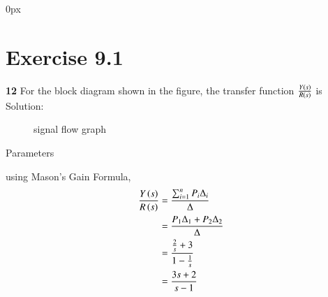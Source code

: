 \documentclass[journal,12pt,twocolumn]{IEEEtran}
\theoremstyle{remark}
\begin{document}
\parindent 0px


\vspace{3cm}

\title{}
\author{EE23BTECH11217 - Prajwal M$^{*}$
}
\maketitle
\newpage
\bigskip



\section*{Exercise 9.1}

\noindent \textbf{12} \hspace{2pt}For the block diagram shown in the figure, the transfer function $\frac{Y\left(s\right)}{R\left(s\right)}$ is \\



Solution:\\
\begin{figure}[h]
    \centering
    
    \caption{signal flow graph}
    \label{fig: 9.1.12.1}
\end{figure}

\begin{table}[h]
    \centering
    
    \caption{Parameters}
    \label{tab:9.1.12.1}
\end{table}
using Mason's Gain Formula,
\begin{align}
    \frac{Y\left(s\right)}{R\left(s\right)} & = \frac{{\sum_{i=1}^{n} P_i\Delta_i}}{{\Delta}}\\
    & = \frac{P_1\Delta_1 + P_2\Delta_2}{\Delta}\\
    & = \frac{\frac{2}{s} + 3}{1 - \frac{1}{s}}\\
    & = \frac{3s+2}{s-1}
\end{align}
\end{document}
